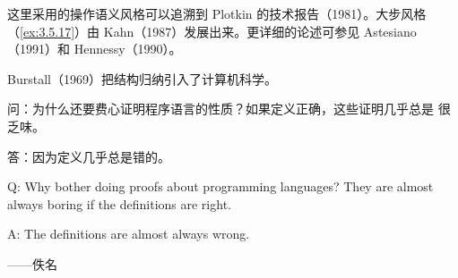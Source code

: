 这里采用的操作语义风格可以追溯到 Plotkin 的技术报告（1981）。大步风格
（\cref{ex:3.5.17}）由 Kahn（1987）发展出来。更详细的论述可参见
Astesiano（1991）和 Hennessy（1990）。

Burstall（1969）把结构归纳引入了计算机科学。

\bilingualepigraph
  {问：为什么还要费心证明程序语言的性质？如果定义正确，这些证明几乎总是
   很乏味。\par
   答：因为定义几乎总是错的。}
  {Q: Why bother doing proofs about programming languages? They are almost
   always boring if the definitions are right.\par
   A: The definitions are almost always wrong.}
  {——佚名}
